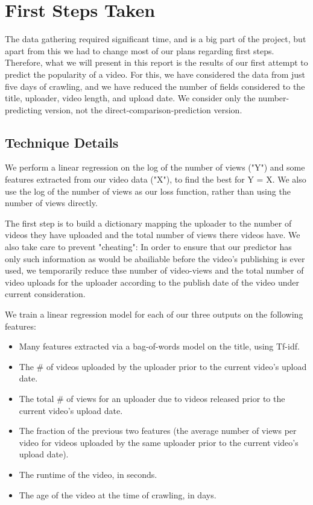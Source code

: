 \documentclass{article} %
\begin{document}
\section{First Steps Taken}

The data gathering required significant time, and is a big part of the project, but apart from this we had to change most of our plans regarding first steps.  Therefore, what we will present in this report is the results of our first attempt to predict the popularity of a video.  For this, we have considered the data from just five days of crawling, and we have reduced the number of fields considered to the title, uploader, video length, and upload date.  We consider only the number-predicting version, not the direct-comparison-prediction version.

\subsection{Technique Details}

We perform  a linear regression on the log of the number of views ("Y") and some features extracted from our video data ("X"), to find the best \beta for Y  = \beta * X.  We also use the log of the number of views as our loss function, rather than using the number of views directly.

The first step is to build a dictionary mapping the uploader to the number of videos they have uploaded and the total number of views there videos have. We also take care to prevent "cheating":  In order to ensure that our predictor has only such information as would be abailiable before the video's publishing is ever used, we temporarily reduce thse number of video-views and the total number of video uploads for the uploader according to the publish date of the video under current consideration.

We train a linear regression model for each of our three outputs on the following features:
\begin{itemize}
\item
Many features extracted via a bag-of-words model on the title, using Tf-idf.
\item
The \# of videos uploaded by the uploader prior to the current video's upload date.
\item
The total \# of views for an uploader due to videos released prior to the current video's upload date.
\item
The fraction of the previous two features (the average number of views per video for videos uploaded by the same uploader prior to the current video's upload date).
\item
The runtime of the video, in seconds.
\item
The age of the video at the time of crawling, in days.
\end{itemize}
\end{document}
